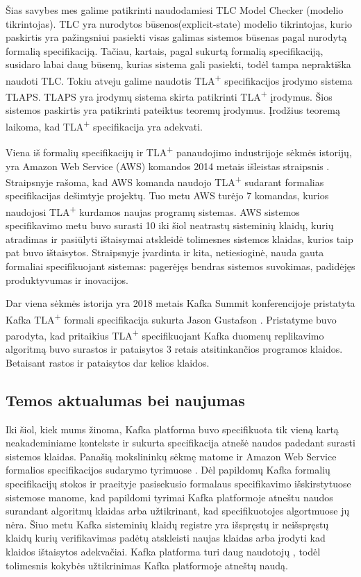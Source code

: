 \documentclass{VUMIFPSmagistrinis}
\begin{document}
	Šias savybes mes galime patikrinti naudodamiesi TLC Model Checker (modelio tikrintojas).
		TLC yra nurodytos būsenos(explicit-state) modelio tikrintojas, kurio paskirtis yra pažingsniui pasiekti visas galimas sistemos būsenas pagal nurodytą formalią specifikaciją.
		Tačiau, kartais, pagal sukurtą formalią specifikaciją, susidaro labai daug būsenų, kurias sistema gali pasiekti, todėl tampa nepraktiška naudoti TLC.
		Tokiu atveju galime naudotis TLA\textsuperscript{+} specifikacijos įrodymo sistema TLAPS.
		TLAPS yra įrodymų sistema skirta patikrinti TLA\textsuperscript{+} įrodymus.
		Šios sistemos paskirtis yra patikrinti pateiktus teoremų įrodymus.
		Įrodžius teoremą laikoma, kad TLA\textsuperscript{+} specifikacija yra adekvati.


		Viena iš formalių specifikacijų ir TLA\textsuperscript{+} panaudojimo industrijoje sėkmės istorijų, yra Amazon Web Service (AWS) komandos 2014 metais išleistas straipsnis \cite{newcombe2014use}.
		Straipsnyje rašoma,  kad AWS komanda naudojo TLA\textsuperscript{+} sudarant formalias specifikacijas dešimtyje projektų. Tuo metu AWS turėjo 7 komandas, kurios naudojosi TLA\textsuperscript{+} kurdamos naujas programų sistemas.
		AWS sistemos specifikavimo metu buvo surasti 10 iki šiol neatrastų sisteminių klaidų, kurių atradimas ir pasiūlyti ištaisymai atskleidė tolimesnes sistemos klaidas, kurios taip pat buvo ištaisytos.
		Straipsnyje įvardinta ir kita, netiesioginė, nauda gauta formaliai specifikuojant sistemas: pagerėjęs bendras sistemos suvokimas, padidėjęs produktyvumas ir inovacijos.
		

		Dar viena sėkmės istorija yra 2018 metais Kafka Summit konferencijoje pristatyta Kafka TLA\textsuperscript{+} formali specifikacija sukurta Jason Gustafson \cite{kfkTla}.
		Pristatyme buvo parodyta, kad pritaikius TLA\textsuperscript{+} specifikuojant Kafka duomenų replikavimo algoritmą buvo surastos ir pataisytos 3 retais atsitinkančios programos klaidos.
		Betaisant rastos ir pataisytos dar kelios klaidos.

	\subsection*{Temos aktualumas bei naujumas}
		Iki šiol, kiek mums žinoma, Kafka platforma buvo specifikuota tik vieną kartą \cite{kfkTla} neakademiniame kontekste ir sukurta specifikacija atnešė naudos padedant surasti sistemos klaidas.
		Panašią mokslininkų sėkmę matome ir Amazon Web Service formalios specifikacijos sudarymo tyrimuose \cite{newcombe2014use}.
		Dėl papildomų Kafka formalių specifikacijų stokos ir praeityje pasisekusio formalaus specifikavimo išskirstytuose sistemose manome, kad papildomi tyrimai Kafka platformoje atneštu naudos surandant algoritmų klaidas arba užtikrinant, kad specifikuotojes algortmuose jų nėra.
		Šiuo metu Kafka sisteminių klaidų registre \cite{kfkissue} yra išspręstų ir neišspręstų  klaidų kurių verifikavimas padėtų atskleisti naujas klaidas arba įrodyti kad klaidos ištaisytos adekvačiai.
		Kafka platforma turi daug naudotojų \cite{kfk}, todėl tolimesnis kokybės užtikrinimas Kafka platformoje atneštų naudą.
\end{document}
